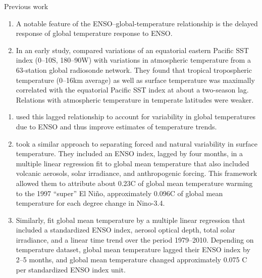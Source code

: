 \documentclass[aspectratio=169,xcolor=dvipsnames]{beamer}
\begin{document}
\begin{frame}[allowframebreaks]{Previous work}\fontsize{7pt}{9pt}\selectfont
  \begin{enumerate}
  \item A notable feature of the ENSO–global-temperature relationship
    is the delayed response of global temperature response to ENSO.
  \item In an early study, \citet{Angell1981comparison} compared
    variations of an equatorial eastern Pacific SST index
    (0--10\textdegree S, 180\textdegree--90\textdegree W) with
    variations in atmospheric temperature from a 63-station global
    radiosonde network. They found that tropical tropospheric
    temperature (0--16km average) as well as surface temperature was
    maximally correlated with the equatorial Pacific SST index at
    about a two-season lag.  Relations with atmospheric temperature in
    temperate latitudes were weaker.
  \end{enumerate}
  \begin{enumerate}
  \item \citet{Angell2000tropospheric} used this lagged relationship
    to account for variability in global temperatures due to ENSO and
    thus improve estimates of temperature trends.

  \item \citet{Lean2008natural} took a similar approach to separating
    forced and natural variability in surface temperature. They
    included an ENSO index, lagged by four months, in a multiple linear
    regression fit to global mean temperature that also included
    volcanic aerosols, solar irradiance, and anthropogenic
    forcing. This framework allowed them to attribute about
    0.23\textdegree C of global mean temperature warming to the 1997
    ``super'' El Ni\~no, approximately 0.096\textdegree C of global
    mean temperature for each degree change in Nino-3.4.

  \item Similarly, \citet{Foster2011global} fit global mean
    temperature by a multiple linear regression that included a
    standardized ENSO index, aerosol optical depth, total solar
    irradiance, and a linear time trend over the period
    1979--2010. Depending on temperature dataset, global mean
    temperature lagged their ENSO index by 2--5 months, and global
    mean temperature changed approximately 0.075 \textdegree C per
    standardized ENSO index unit.  %
    

\end{enumerate}
\end{frame}
\end{document}
